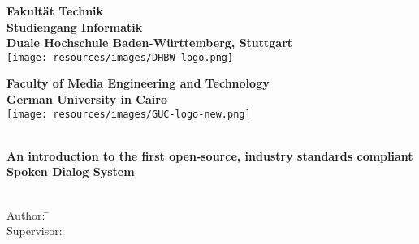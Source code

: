 \newcommand{\titlePage}{

\thispagestyle{empty}
\begin{center}

  \textbf{Fakult{\"a}t Technik}\\[1mm]
  \textbf{Studiengang Informatik}\\[1mm]
  \textbf{Duale Hochschule Baden-W{\"u}rttemberg, Stuttgart}\\[1mm]
	\texttt{[image: resources/images/DHBW-logo.png]}

  \vspace{0.5cm}

	\textbf{Faculty of Media Engineering and Technology}\\[1mm]
	\textbf{German University in Cairo}\\[1mm]
	\texttt{[image: resources/images/GUC-logo-new.png]}
	
	\vspace{2cm}
	\doublespacing
	{\Huge \textbf{\titleOfThesisOne}}\\
  {\large \textbf{An introduction to the first open-source, industry standards compliant Spoken Dialog System}}\\
	\singlespacing
	\vspace{2cm}
	{\large \textbf{\typeOfThesis}}\\
	
	\vfill
	\parbox{1cm}{
  		\begin{large}
    			\begin{tabbing}
       			Author: \hspace{2cm}  
        			\=\authorOfThesis\\[2mm]
      			Supervisor: 
        			\>\supervisorOne\\[2mm]
    			\end{tabbing}
  		\end{large}
	}\\
\end{center}
\clearpage
}
\titlePage

